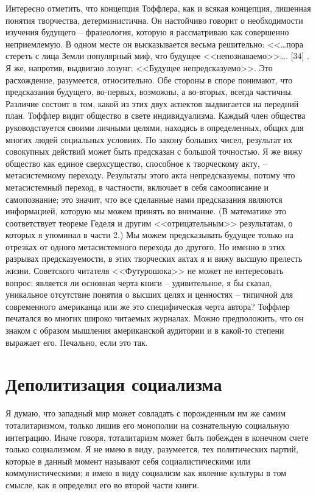 \documentclass{book}
\begin{document}
Интересно отметить, что концепция Тоффлера, как и всякая концепция, лишенная понятия творчества, детерминистична. Он настойчиво говорит о необходимости изучения  будущего -- фразеология, которую я рассматриваю как совершенно непри­емлемую. В одном месте он высказывается весьма решитель­но: <<\ldots пора стереть с лица Земли популярный миф, что буду­щее <<непознаваемо>>\ldots. [34] . Я же, напротив, выдвигаю лозунг: <<Будущее непредсказуемо>>. Это расхождение, разумеется, от­носительно. Обе стороны в споре понимают, что предсказания будущего, во-первых, возможны, а во-вторых, всегда частичны. Различие состоит в том, какой из этих двух аспектов выд­вигается на передний план. Тоффлер видит общество в свете индивидуализма. Каждый член общества руководствуется своими личными целями, находясь в определенных, общих для многих людей социальных условиях. По закону больших чисел, результат их совокупных действий может быть предсказан с большой точностью. Я же вижу общество как единое сверх­существо, способное к 
творческому 
акту, -- метасистемному пе­реходу. Результаты этого акта непредсказуемы, потому что метасистемный переход, в частности, включает в себя самоописа­ние  и самопознание;  это значит, что все сделанные нами пред­сказания являются информацией, которую мы можем принять во внимание. (В математике это соответствует теореме Геделя и другим <<отрицательным>> результатам, о которых я упоминал в части 2.) Мы можем предсказывать будущее только на отрез­ках от одного метасистемного перехода до другого. Но именно в этих разрывах предсказуемости, в этих творческих актах я и вижу высшую прелесть жизни.
Советского читателя <<Футурошока>> не может не интересо­вать вопрос: является ли основная черта книги -- удивительное, я бы сказал, уникальное  отсутствие понятия о высших целях и ценностях -- типичной для современного американца или же это специфическая черта автора? Тоффлер печатался во многих широко читаемых журналах. Можно предположить, что он зна­ком с образом мышления американской аудитории и в какой-то степени выражает его. Печально, если это так.


\section{Деполитизация социализма}

Я думаю, что западный мир может совладать с порожденным им же самим тоталитаризмом, только лишив его монополии на сознательную социальную интеграцию. Иначе говоря, тота­литаризм может быть побежден в конечном счете только со­циализмом. Я не имею в виду, разумеется, тех политических партий, которые в данный момент называют себя социалисти­ческими или коммунистическими; я имею в виду социализм как явление культуры в том смысле, как я определил его во второй части книги.
\end{document}
